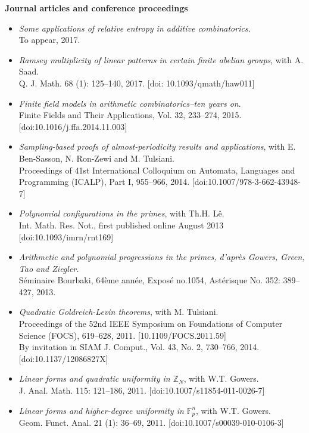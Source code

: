\documentclass[11pt]{article}
\newenvironment{mitemize}{
\begin{itemize}
  \setlength{\itemsep}{1pt}
  \setlength{\parskip}{0pt}
  \setlength{\parsep}{0pt}
}{\end{itemize}}
\def\Z{\mathbb{Z}}
\def\F{\mathbb{F}}
\def\Q{\mathbb{Q}}
\begin{document}
\vspace{3pt}
\textbf{Journal articles and conference proceedings}
\begin{mitemize}
\item \textit{Some applications of relative entropy in additive combinatorics.}
\\To appear, 2017.
\item \textit{Ramsey multiplicity of linear patterns in certain finite abelian groups}, with A. Saad.
\\Q. J. Math. 68 (1): 125--140, 2017. [doi: 10.1093/qmath/haw011]
\item \textit{Finite field models in arithmetic combinatorics--ten years on}. 
\\Finite Fields and Their Applications, Vol. 32, 233--274, 2015. [doi:10.1016/j.ffa.2014.11.003]
\item \textit{Sampling-based proofs of almost-periodicity results and applications}, with E. Ben-Sasson, N. Ron-Zewi and M. Tulsiani. 
\\Proceedings of 41st International Colloquium on Automata, Languages and Programming (ICALP), Part I, 955--966, 2014. $[$doi:10.1007/978-3-662-43948-7]
\item \textit{Polynomial configurations in the primes}, with Th.H. L\^e. 
\\Int. Math. Res. Not., first published online August 2013 [doi:10.1093/imrn/rnt169]
\item \textit{Arithmetic and polynomial progressions in the primes, d'apr\`es Gowers, Green, Tao and Ziegler.} 
\\S\'eminaire Bourbaki, 64\`eme ann\'ee, Expos\'e no.1054, Ast\'erisque No. 352: 389--427, 2013.
\item \textit{Quadratic Goldreich-Levin theorems}, with M. Tulsiani. 
\\Proceedings of the 52nd IEEE Symposium on Foundations of Computer Science (FOCS), 619--628, 2011. $[$10.1109/FOCS.2011.59]
\\By invitation in SIAM J. Comput., Vol. 43, No. 2, 730--766, 2014. [doi:10.1137/12086827X]
\item \textit{Linear forms and quadratic uniformity in $\Z_{N}$}, with W.T. Gowers. 
\\J. Anal. Math. 115: 121--186, 2011. [doi:10.1007/s11854-011-0026-7] 
\item \textit{Linear forms and higher-degree uniformity in $\F_{p}^{n}$}, with W.T. Gowers. 
\\Geom. Funct. Anal. 21 (1): 36--69, 2011. [doi:10.1007/s00039-010-0106-3] 

\end{mitemize}
\end{document}
